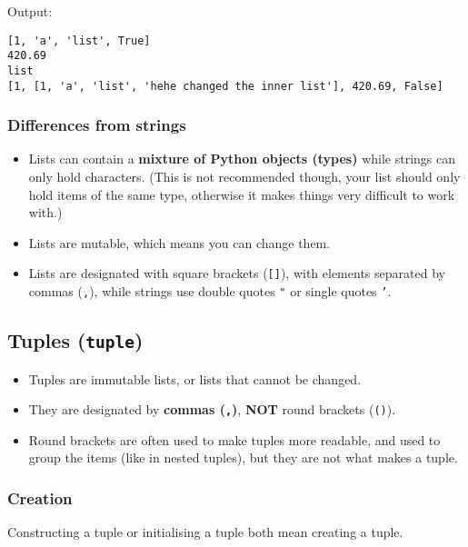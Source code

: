 \documentclass[11pt]{article}
\begin{document}
 \noindent Output:

\begin{verbatim}
[1, 'a', 'list', True]
420.69
list
[1, [1, 'a', 'list', 'hehe changed the inner list'], 420.69, False]
\end{verbatim}

\subsubsection{Differences from strings}
\label{sec:org9445ad6}
\begin{itemize}
\item Lists can contain a \textbf{mixture of Python objects (types)} while strings can only hold characters. (This is not recommended though, your list should only hold items of the same type, otherwise it makes things very difficult to work with.)
\item Lists are mutable, which means you can change them.
\item Lists are designated with square brackets (\texttt{[]}), with elements separated by commas (\texttt{,}), while strings use double quotes \texttt{"} or single quotes \texttt{'}.
\end{itemize}

\subsection{Tuples (\texttt{tuple})}
\label{sec:org8b4a07d}
\begin{itemize}
\item Tuples are immutable lists, or lists that cannot be changed.
\item They are designated by \textbf{commas (\texttt{,})}, \textbf{NOT} round brackets (\texttt{()}).
\item Round brackets are often used to make tuples more readable, and used to group the items (like in nested tuples), but they are not what makes a tuple.
\end{itemize}

\subsubsection{Creation}
\label{sec:org65b73ea}
Constructing a tuple or initialising a tuple both mean creating a tuple.
\end{document}
